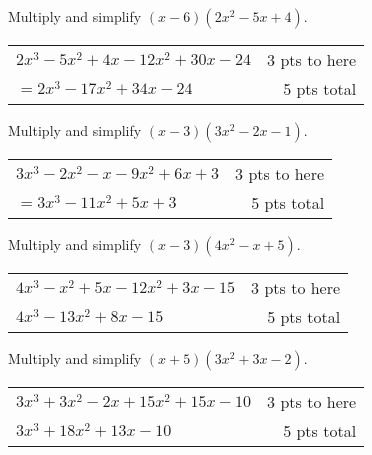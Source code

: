 {
	Multiply and simplify $(x-6)(2x^2-5x+4)$.
}
{
	\begin{tabular}{l r}
	$2x^3-5x^2+4x-12x^2+30x-24$ & 3 pts to here\\
	$=2x^3-17x^2+34x-24$ & 5 pts total
	\end{tabular}
}

{
	Multiply and simplify $(x-3)(3x^2-2x-1)$.
}
{
	\begin{tabular}{l r}
	$3x^3-2x^2-x-9x^2+6x+3$ & 3 pts to here\\
	$=3x^3-11x^2+5x+3 $ & 5 pts total
	\end{tabular}
}

{
	Multiply and simplify $(x-3)(4x^2-x+5)$.
}
{
	\begin{tabular}{l r}
	$4x^3-x^2+5x-12x^2+3x-15$ & 3 pts to here\\
	$4x^3-13x^2+8x-15 $ & 5 pts total
	\end{tabular}
}

{
	Multiply and simplify $(x+5)(3x^2+3x-2)$.
}
{
	\begin{tabular}{l r}
	$ 3x^3+3x^2-2x+15x^2+15x-10$ & 3 pts to here\\
	$ 3x^3+18x^2+13x-10$ & 5 pts total
	\end{tabular}
}
